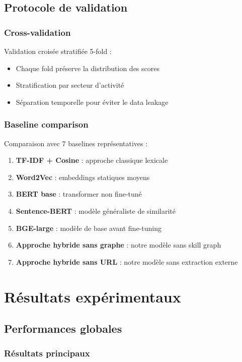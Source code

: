 \documentclass[12pt,a4paper]{report}
\begin{document}
\subsection{Protocole de validation}

\subsubsection{Cross-validation}

Validation croisée stratifiée 5-fold :
\begin{itemize}
\item Chaque fold préserve la distribution des scores
\item Stratification par secteur d'activité
\item Séparation temporelle pour éviter le data leakage
\end{itemize}

\subsubsection{Baseline comparison}

Comparaison avec 7 baselines représentatives :
\begin{enumerate}
\item \textbf{TF-IDF + Cosine} : approche classique lexicale
\item \textbf{Word2Vec} : embeddings statiques moyens
\item \textbf{BERT base} : transformer non fine-tuné
\item \textbf{Sentence-BERT} : modèle généraliste de similarité
\item \textbf{BGE-large} : modèle de base avant fine-tuning
\item \textbf{Approche hybride sans graphe} : notre modèle sans skill graph
\item \textbf{Approche hybride sans URL} : notre modèle sans extraction externe
\end{enumerate}

\section{Résultats expérimentaux}

\subsection{Performances globales}

\subsubsection{Résultats principaux}
\end{document}
